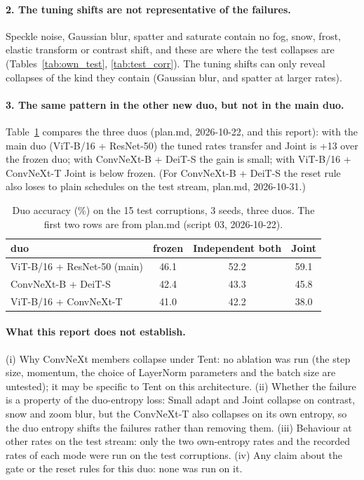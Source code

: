 \documentclass[10pt]{article}
\newcommand{\vit}{ViT-B/16}
\newcommand{\cnx}{ConvNeXt-T}
\begin{document}
\paragraph{2. The tuning shifts are not representative of the failures.} Speckle noise, Gaussian blur, spatter and saturate contain no fog, snow, frost, elastic transform or contrast shift, and these are where the test collapses are (Tables~\ref{tab:own_test}, \ref{tab:test_corr}). The tuning shifts can only reveal collapses of the kind they contain (Gaussian blur, and spatter at larger rates).

\paragraph{3. The same pattern in the other new duo, but not in the main duo.} Table~\ref{tab:duos} compares the three duos (plan.md, 2026-10-22, and this report): with the main duo (\vit{} + ResNet-50) the tuned rates transfer and Joint is +13 over the frozen duo; with ConvNeXt-B + DeiT-S the gain is small; with \vit{} + \cnx{} Joint is below frozen. (For ConvNeXt-B + DeiT-S the reset rule also loses to plain schedules on the test stream, plan.md, 2026-10-31.)

\begin{table}[H]
  \centering\small
  \caption{Duo accuracy (\%) on the 15 test corruptions, 3 seeds, three duos. The first two rows are from plan.md (script 03, 2026-10-22).}
  \label{tab:duos}
  \begin{tabular}{@{}l ccc@{}}
    \toprule
    duo & frozen & Independent both & Joint \\
    \midrule
    \vit{} + ResNet-50 (main) & 46.1 & 52.2 & 59.1 \\
    ConvNeXt-B + DeiT-S & 42.4 & 43.3 & 45.8 \\
    \vit{} + \cnx{} & 41.0 & 42.2 & 38.0 \\
    \bottomrule
  \end{tabular}
\end{table}

\paragraph{What this report does not establish.} (i) Why ConvNeXt members collapse under Tent: no ablation was run (the step size, momentum, the choice of LayerNorm parameters and the batch size are untested); it may be specific to Tent on this architecture. (ii) Whether the failure is a property of the duo-entropy loss: Small adapt and Joint collapse on contrast, snow and zoom blur, but the \cnx{} also collapses on its own entropy, so the duo entropy shifts the failures rather than removing them. (iii) Behaviour at other rates on the test stream: only the two own-entropy rates and the recorded rates of each mode were run on the test corruptions. (iv) Any claim about the gate or the reset rules for this duo: none was run on it.
\end{document}
